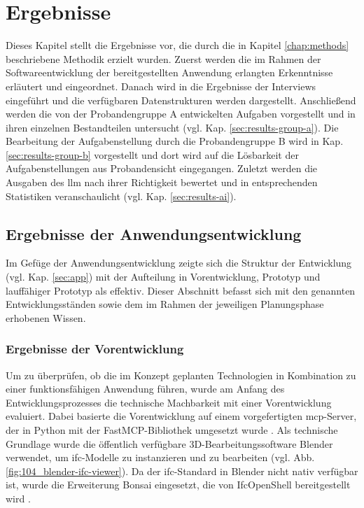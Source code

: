 \chapter{\textbf{Ergebnisse}}
\label{chap:result}

Dieses Kapitel stellt die Ergebnisse vor, die durch die in Kapitel \ref{chap:methods} beschriebene Methodik erzielt wurden.
Zuerst werden die im Rahmen der Softwareentwicklung der bereitgestellten Anwendung erlangten Erkenntnisse erläutert und eingeordnet.
Danach wird in die Ergebnisse der Interviews eingeführt und die verfügbaren Datenstrukturen werden dargestellt.
Anschließend werden die von der Probandengruppe A entwickelten Aufgaben vorgestellt und in ihren einzelnen Bestandteilen untersucht (vgl. Kap. \ref{sec:results-group-a}).
Die Bearbeitung der Aufgabenstellung durch die Probandengruppe B wird in Kap. \ref{sec:results-group-b} vorgestellt und dort wird auf die Lösbarkeit der Aufgabenstellungen aus Probandensicht eingegangen.
Zuletzt werden die Ausgaben des \gls{llm} nach ihrer Richtigkeit bewertet und in entsprechenden Statistiken veranschaulicht (vgl. Kap. \ref{sec:results-ai}).

\section{Ergebnisse der Anwendungsentwicklung}
\label{sec:results-software-development}

Im Gefüge der Anwendungsentwicklung zeigte sich die Struktur der Entwicklung (vgl. Kap. \ref{sec:app}) mit der Aufteilung in Vorentwicklung, Prototyp und lauffähiger Prototyp als effektiv.
Dieser Abschnitt befasst sich mit den genannten Entwicklungsständen sowie dem im Rahmen der jeweiligen Planungsphase erhobenen Wissen.

\subsection{Ergebnisse der Vorentwicklung}

Um zu überprüfen, ob die im Konzept geplanten Technologien in Kombination zu einer funktionsfähigen Anwendung führen, 
wurde am Anfang des Entwicklungsprozesses die technische Machbarkeit mit einer Vorentwicklung evaluiert.
Dabei basierte die Vorentwicklung auf einem vorgefertigten \gls{mcp}-Server, der in Python mit der FastMCP-Bibliothek umgesetzt wurde \cite{github2025bonsaimcp}.
Als technische Grundlage wurde die öffentlich verfügbare 3D-Bearbeitungssoftware Blender verwendet, um \gls{ifc}-Modelle zu instanzieren und zu bearbeiten (vgl. Abb. \ref{fig:104_blender-ifc-viewer}).
Da der \gls{ifc}-Standard in Blender nicht nativ verfügbar ist, wurde die Erweiterung Bonsai eingesetzt, die von IfcOpenShell bereitgestellt wird \cite{bonsai2026blenderextensions}. \\

